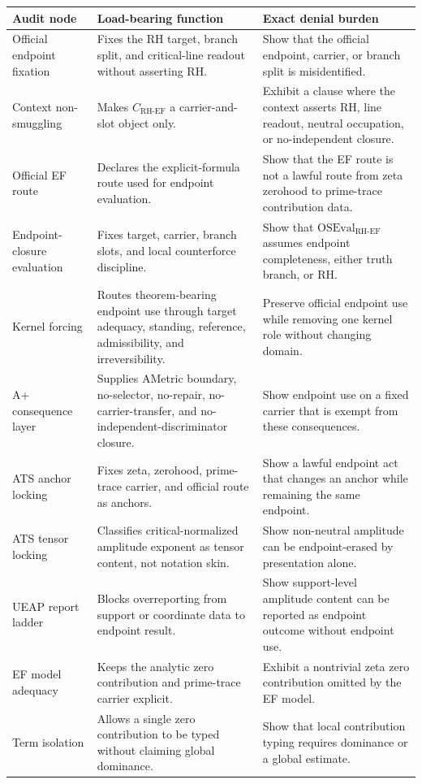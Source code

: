 \documentclass[11pt]{article}
\newcommand{\CRHEF}{C_{\mathrm{RH}\text{-}\mathrm{EF}}}
\newcommand{\OSEvalEF}{\mathrm{OSEval}_{\mathrm{RH}\text{-}\mathrm{EF}}}
\begin{document}
\begingroup\small
\begin{longtable}{L{0.21\textwidth}L{0.31\textwidth}L{0.37\textwidth}}
\toprule
\textbf{Audit node} & \textbf{Load-bearing function} & \textbf{Exact denial burden}\\
\midrule
Official endpoint fixation & Fixes the RH target, branch split, and critical-line readout without asserting RH. & Show that the official endpoint, carrier, or branch split is misidentified.\\
Context non-smuggling & Makes \(\CRHEF\) a carrier-and-slot object only. & Exhibit a clause where the context asserts RH, line readout, neutral occupation, or no-independent closure.\\
Official EF route & Declares the explicit-formula route used for endpoint evaluation. & Show that the EF route is not a lawful route from zeta zerohood to prime-trace contribution data.\\
Endpoint-closure evaluation & Fixes target, carrier, branch slots, and local counterforce discipline. & Show that \(\OSEvalEF\) assumes endpoint completeness, either truth branch, or RH.\\
Kernel forcing & Routes theorem-bearing endpoint use through target adequacy, standing, reference, admissibility, and irreversibility. & Preserve official endpoint use while removing one kernel role without changing domain.\\
A+ consequence layer & Supplies AMetric boundary, no-selector, no-repair, no-carrier-transfer, and no-independent-discriminator closure. & Show endpoint use on a fixed carrier that is exempt from these consequences.\\
ATS anchor locking & Fixes zeta, zerohood, prime-trace carrier, and official route as anchors. & Show a lawful endpoint act that changes an anchor while remaining the same endpoint.\\
ATS tensor locking & Classifies critical-normalized amplitude exponent as tensor content, not notation skin. & Show non-neutral amplitude can be endpoint-erased by presentation alone.\\
UEAP report ladder & Blocks overreporting from support or coordinate data to endpoint result. & Show support-level amplitude content can be reported as endpoint outcome without endpoint use.\\
EF model adequacy & Keeps the analytic zero contribution and prime-trace carrier explicit. & Exhibit a nontrivial zeta zero contribution omitted by the EF model.\\
Term isolation & Allows a single zero contribution to be typed without claiming global dominance. & Show that local contribution typing requires dominance or a global estimate.\\

\end{longtable}
\end{document}
